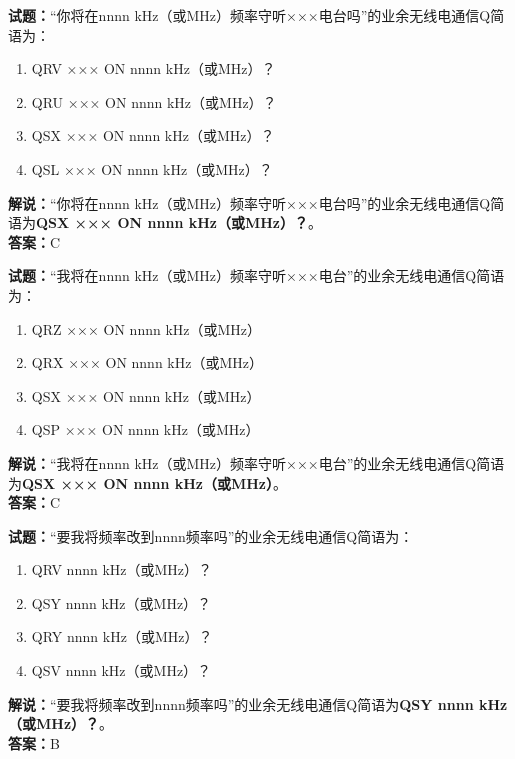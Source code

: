 \documentclass{ctexbook}
\begin{document}
\vspace{1em}

\textbf{试题：}“你将在nnnn \si{\kHz}（或\unit{\MHz}）频率守听×××电台吗”的业余无线电通信Q简语为：
\begin{enumerate}[leftmargin=3em]
  \item QRV ××× ON nnnn \si{\kHz}（或\unit{\MHz}）？
  \item QRU ××× ON nnnn \si{\kHz}（或\unit{\MHz}）？
  \item QSX ××× ON nnnn \si{\kHz}（或\unit{\MHz}）？
  \item QSL ××× ON nnnn \si{\kHz}（或\unit{\MHz}）？
\end{enumerate}
\noindent\textbf{解说：}“你将在nnnn \si{\kHz}（或\unit{\MHz}）频率守听×××电台吗”的业余无线电通信Q简语为\textbf{QSX ××× ON nnnn \si{\kHz}（或\unit{\MHz}）？}。\\\noindent\textbf{答案：}C

\vspace{1em}

\textbf{试题：}“我将在nnnn \si{\kHz}（或\unit{\MHz}）频率守听×××电台”的业余无线电通信Q简语为：
\begin{enumerate}[leftmargin=3em]
  \item QRZ ××× ON nnnn \si{\kHz}（或\unit{\MHz}）
  \item QRX ××× ON nnnn \si{\kHz}（或\unit{\MHz}）
  \item QSX ××× ON nnnn \si{\kHz}（或\unit{\MHz}）
  \item QSP ××× ON nnnn \si{\kHz}（或\unit{\MHz}）
\end{enumerate}
\noindent\textbf{解说：}“我将在nnnn \si{\kHz}（或\unit{\MHz}）频率守听×××电台”的业余无线电通信Q简语为\textbf{QSX ××× ON nnnn \si{\kHz}（或\unit{\MHz}）}。\\\noindent\textbf{答案：}C

\vspace{1em}

\textbf{试题：}“要我将频率改到nnnn频率吗”的业余无线电通信Q简语为：
\begin{enumerate}[leftmargin=3em]
  \item QRV nnnn \si{\kHz}（或\unit{\MHz}）？
  \item QSY nnnn \si{\kHz}（或\unit{\MHz}）？
  \item QRY nnnn \si{\kHz}（或\unit{\MHz}）？
  \item QSV nnnn \si{\kHz}（或\unit{\MHz}）？
\end{enumerate}
\noindent\textbf{解说：}“要我将频率改到nnnn频率吗”的业余无线电通信Q简语为\textbf{QSY nnnn \si{\kHz}（或\unit{\MHz}）？}。\\\noindent\textbf{答案：}B
\end{document}
